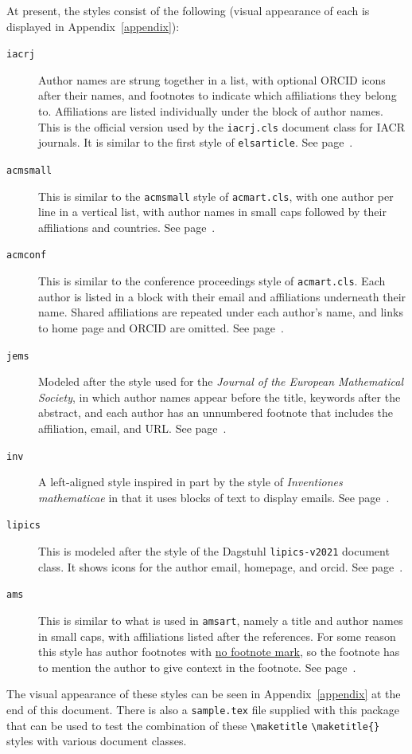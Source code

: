 \documentclass{article}
\newcommand{\cmd}[2][]{%
  \def\FirstArg{#1}%
  \ifx\FirstArg\empty%
    \texttt{\textbackslash{}#2}%
  \else%
    \texttt{\textbackslash{}#2\{#1\}}%
  \fi
}
\begin{document}
At present, the styles consist of the following (visual appearance
of each is displayed in Appendix~\ref{appendix}):
\begin{description}
\item[\texttt{iacrj}] Author names are strung together in a list, with
optional ORCID icons after their names, and footnotes to indicate
which affiliations they belong to. Affiliations are listed
individually under the block of author names.  This is the official
version used by the \texttt{iacrj.cls} document class for IACR
journals. It is similar to the first style of \texttt{elsarticle}. See page~\pageref{iacrj}.
\item[\texttt{acmsmall}] This is similar to the \texttt{acmsmall} style of \texttt{acmart.cls},
with one author per line in a vertical list, with author names in small caps followed
by their affiliations and countries. See page~\pageref{acmsmall}.
\item[\texttt{acmconf}] This is similar to the conference proceedings style
of \texttt{acmart.cls}. Each author is listed in a block with their email and
affiliations underneath their name. Shared affiliations are repeated under each author's name,
and links to home page and ORCID are omitted.
See page~\pageref{acmconf}.
\item[\texttt{jems}] Modeled after the style used for the {\em Journal of the European Mathematical Society},
in which author names appear before the title, keywords after the
abstract, and each author has an unnumbered footnote that includes the
affiliation, email, and URL. See page~\pageref{jems}.
\item[\texttt{inv}] A left-aligned style inspired in part by the style
of {\em Inventiones mathematicae} in that it uses blocks of text to display
emails. See page~\pageref{inv}.
\item[\texttt{lipics}] This is modeled after the style of the Dagstuhl \texttt{lipics-v2021} document
class. It shows icons for the author email, homepage, and orcid. See page~\pageref{lipics}.
\item[\texttt{ams}] This is similar to what is used in \texttt{amsart}, namely
a title and author names in small caps, with affiliations listed after
the references. For some reason this style has author footnotes
with \href{https://ctan.math.washington.edu/tex-archive/info/amscls-doc/Author_Handbook_Journals.pdf}{no
footnote mark}, so the footnote has to mention the author to give
context in the footnote. See page~\pageref{ams}.
\end{description}
The visual appearance of these styles can be seen in Appendix~\ref{appendix} at
the end of this document.
There is also a \texttt{sample.tex} file supplied with this package that
can be used to test the combination of these \cmd{maketitle} styles
with various document classes.
\end{document}
